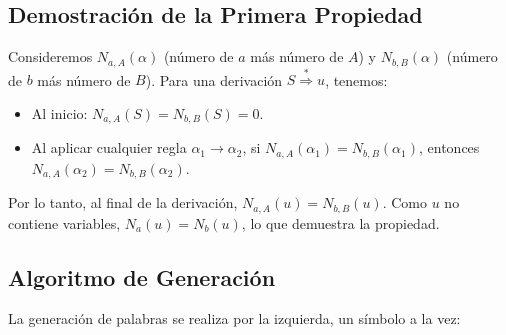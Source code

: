 \documentclass[12pt]{report} %
\providecommand{\tightlist}{%
  \setlength{\itemsep}{0pt}\setlength{\parskip}{0pt}}
\begin{document}
\hypertarget{demostraciuxf3n-de-la-primera-propiedad}{%
\subsection{Demostración de la Primera
Propiedad}\label{demostraciuxf3n-de-la-primera-propiedad}}

Consideremos \(N_{a,A}(\alpha)\) (número de \(a\) más número de \(A\)) y
\(N_{b,B}(\alpha)\) (número de \(b\) más número de \(B\)). Para una
derivación \(S \overset{*}{\Rightarrow} u\), tenemos:

\begin{itemize}
\tightlist
\item
  Al inicio: \(N_{a,A}(S) = N_{b,B}(S) = 0\).\\
\item
  Al aplicar cualquier regla \(\alpha_1 \to \alpha_2\), si
  \(N_{a,A}(\alpha_1) = N_{b,B}(\alpha_1)\), entonces
  \(N_{a,A}(\alpha_2) = N_{b,B}(\alpha_2)\).
\end{itemize}

Por lo tanto, al final de la derivación, \(N_{a,A}(u) = N_{b,B}(u)\).
Como \(u\) no contiene variables, \(N_a(u) = N_b(u)\), lo que demuestra
la propiedad.

\hypertarget{algoritmo-de-generaciuxf3n}{%
\subsection{Algoritmo de Generación}\label{algoritmo-de-generaciuxf3n}}

La generación de palabras se realiza por la izquierda, un símbolo a la
vez:
\end{document}
